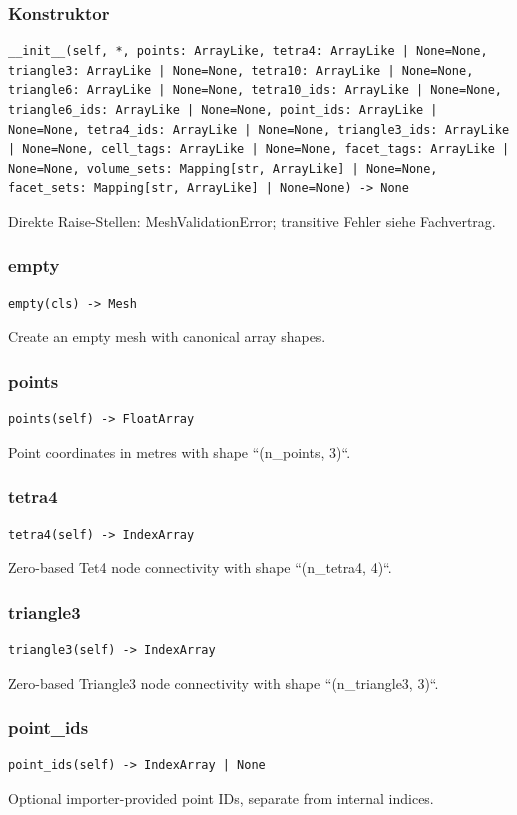 \subsubsection*{Konstruktor}
\begin{lstlisting}
__init__(self, *, points: ArrayLike, tetra4: ArrayLike | None=None, triangle3: ArrayLike | None=None, tetra10: ArrayLike | None=None, triangle6: ArrayLike | None=None, tetra10_ids: ArrayLike | None=None, triangle6_ids: ArrayLike | None=None, point_ids: ArrayLike | None=None, tetra4_ids: ArrayLike | None=None, triangle3_ids: ArrayLike | None=None, cell_tags: ArrayLike | None=None, facet_tags: ArrayLike | None=None, volume_sets: Mapping[str, ArrayLike] | None=None, facet_sets: Mapping[str, ArrayLike] | None=None) -> None
\end{lstlisting}
Direkte Raise-Stellen: MeshValidationError; transitive Fehler siehe Fachvertrag.
\subsubsection*{empty}
\begin{lstlisting}
empty(cls) -> Mesh
\end{lstlisting}
Create an empty mesh with canonical array shapes.
\subsubsection*{points}
\begin{lstlisting}
points(self) -> FloatArray
\end{lstlisting}
Point coordinates in metres with shape ``(n\_points, 3)``.
\subsubsection*{tetra4}
\begin{lstlisting}
tetra4(self) -> IndexArray
\end{lstlisting}
Zero-based Tet4 node connectivity with shape ``(n\_tetra4, 4)``.
\subsubsection*{triangle3}
\begin{lstlisting}
triangle3(self) -> IndexArray
\end{lstlisting}
Zero-based Triangle3 node connectivity with shape ``(n\_triangle3, 3)``.
\subsubsection*{point\_ids}
\begin{lstlisting}
point_ids(self) -> IndexArray | None
\end{lstlisting}
Optional importer-provided point IDs, separate from internal indices.
